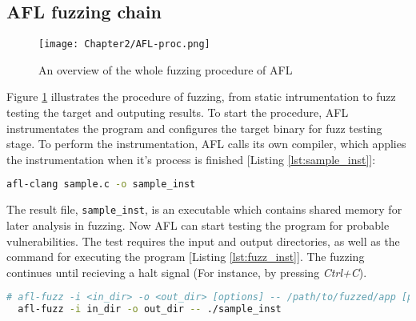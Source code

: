\subsection{AFL fuzzing chain}

\begin{figure}[!t]
    \texttt{[image: Chapter2/AFL-proc.png]}
    \centering
    \caption{An overview of the whole fuzzing procedure of AFL}
    \label{fig:afl-proc}
\end{figure}

Figure \ref{fig:afl-proc} illustrates the procedure of fuzzing, from static intrumentation to fuzz testing the target and outputing results. To start the procedure, AFL instrumentates the program and configures the target binary for fuzz testing stage. To perform the instrumentation, AFL calls its own compiler, which applies the instrumentation when it's process is finished [Listing \ref{lst:sample_inst}]: 

\begin{lstlisting}[language=bash,style=CommandStyle,label={lst:sample_inst},caption=Instrument $sample\_vul$.c]
    afl-clang sample.c -o sample_inst
\end{lstlisting}

The result file, \texttt{sample\_inst}, is an executable which contains shared memory for later analysis in fuzzing. Now AFL can start testing the program for probable vulnerabilities. The test requires the input and output directories, as well as the command for executing the program [Listing \ref{lst:fuzz_inst}]. The fuzzing continues until recieving a halt signal (For instance, by pressing \textit{Ctrl+C}). 

\begin{lstlisting}[language=bash,style=CommandStyle,label={lst:fuzz_inst},caption=Execute AFL]
  # afl-fuzz -i <in_dir> -o <out_dir> [options] -- /path/to/fuzzed/app [params]
  afl-fuzz -i in_dir -o out_dir -- ./sample_inst
\end{lstlisting}
